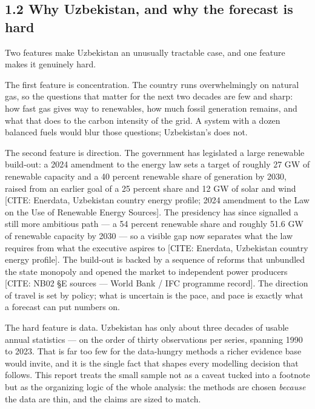 \documentclass[10pt,twocolumn]{article}
\newcommand{\mk}[1]{{\color{amber}\small #1}}
\begin{document}
\subsection*{1.2 Why Uzbekistan, and why the forecast is hard}

Two features make Uzbekistan an unusually tractable case, and one feature makes it genuinely hard.

The first feature is concentration. The country runs overwhelmingly on natural gas, so the questions that matter for the next two decades are few and sharp: how fast gas gives way to renewables, how much fossil generation remains, and what that does to the carbon intensity of the grid. A system with a dozen balanced fuels would blur those questions; Uzbekistan's does not.

The second feature is direction. The government has legislated a large renewable build-out: a 2024 amendment to the energy law sets a target of roughly 27 GW of renewable capacity and a 40 percent renewable share of generation by 2030, raised from an earlier goal of a 25 percent share and 12 GW of solar and wind \mk{[CITE: Enerdata, Uzbekistan country energy profile; 2024 amendment to the Law on the Use of Renewable Energy Sources]}. The presidency has since signalled a still more ambitious path --- a 54 percent renewable share and roughly 51.6 GW of renewable capacity by 2030 --- so a visible gap now separates what the law requires from what the executive aspires to \mk{[CITE: Enerdata, Uzbekistan country energy profile]}. The build-out is backed by a sequence of reforms that unbundled the state monopoly and opened the market to independent power producers \mk{[CITE: NB02 \S{}E sources --- World Bank / IFC programme record]}. The direction of travel is set by policy; what is uncertain is the pace, and pace is exactly what a forecast can put numbers on.

The hard feature is data. Uzbekistan has only about three decades of usable annual statistics --- on the order of thirty observations per series, spanning 1990 to 2023. That is far too few for the data-hungry methods a richer evidence base would invite, and it is the single fact that shapes every modelling decision that follows. This report treats the small sample not as a caveat tucked into a footnote but as the organizing logic of the whole analysis: the methods are chosen \textit{because} the data are thin, and the claims are sized to match.
\end{document}

